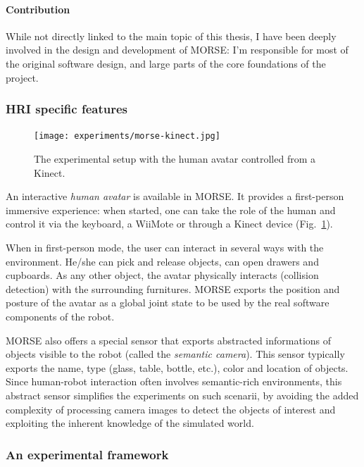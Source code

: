 \paragraph{Contribution} While not directly linked to the main topic of this
thesis, I have been deeply involved in the design and development of MORSE: I'm
responsible for most of the original software design, and large parts of the
core foundations of the project.

\subsubsection{HRI specific features}
\label{sect|morse-hri}

\begin{figure}[t]
      \centering
      \texttt{[image: experiments/morse-kinect.jpg]}
      \caption{The experimental setup with the human avatar controlled from a
      Kinect.}
      \label{fig|kinect-setup}
\end{figure}

An interactive \emph{human avatar} is available in MORSE. It provides a
first-person immersive experience: when started, one can take the role of the
human and control it via the keyboard, a WiiMote or through a Kinect device
(Fig.~\ref{fig|kinect-setup}).

When in first-person mode, the user can interact in several ways with the
environment. He/she can pick and release objects, can open drawers and
cupboards. As any other object, the avatar physically interacts (collision
detection) with the surrounding furnitures.  MORSE exports the position
and posture of the avatar as a global joint state to be used by the real
software components of the robot.

MORSE also offers a special sensor that exports abstracted informations of
objects visible to the robot (called the \emph{semantic camera}). This
sensor typically exports the name, type (glass, table, bottle, etc.), color and
location of objects. Since human-robot interaction often involves
semantic-rich environments, this abstract sensor simplifies the
experiments on such scenarii, by avoiding the added complexity of processing
camera images to detect the objects of interest and exploiting the inherent
knowledge of the simulated world.

\subsubsection{An experimental framework}

